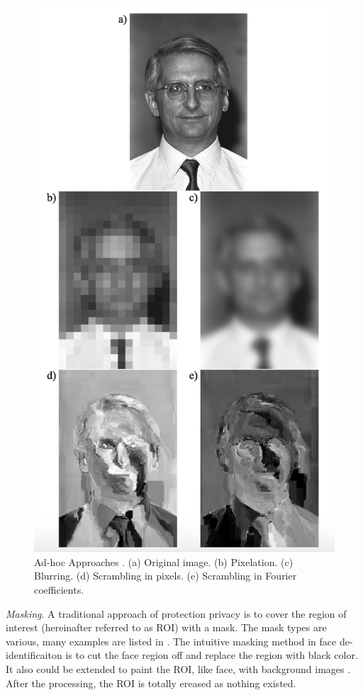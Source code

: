 	\begin{figure}[!htb]
	    \centering
	    \includegraphics[scale=0.8]{figure/adhocVertical}
	    \caption{Ad-hoc Approaches \cite{dufaux10}. (a) Original image. (b) Pixelation.
	    (c) Blurring. (d) Scrambling in pixels. (e) Scrambling in Fourier coefficients.}
	    \label{fig:adhoc_example}
  	\end{figure}

	{\it Masking}. A traditional approach of protection privacy is to cover
	the region of interest (hereinafter referred to as ROI) with a mask. The
	mask types are various, many examples are listed in \cite{Winkler14}. The
	intuitive masking method in face de-identificaiton is to cut the face 
	region off and replace the region with black color. It also could be 
	extended to paint the ROI, like face, with background images  
	\cite{inpaint09,Qureshi09}. After the processing, the ROI is totally
	ereased as nothing existed. 

